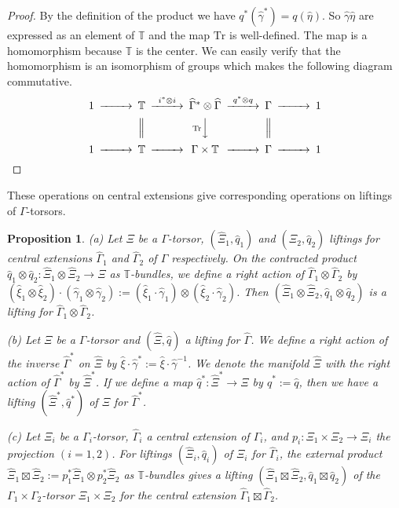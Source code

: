 \documentclass[a4paper,a4paper]{article}
\newtheorem{prop}[thm]{Proposition}
\theoremstyle{definition}
\theoremstyle{remark}
\newcommand{\T}{\mathbb{T}}
\newcommand{\Tr}{\mathrm{Tr}}
\newcommand{\hq}{\widehat{q}}
\def\h#1{ \widehat{#1} }
\begin{document}
\begin{proof}
By the definition of the product we have $q^*(\h{\gamma}^*) = q(\h{\eta})$. So $\h{\gamma} \h{\eta}$ are expressed as an element of $\T$ and the map $\Tr$ is well-defined. The map is a homomorphism because $\T$ is the center. We can easily verify that the homomorphism is an isomorphism of groups which makes the following diagram commutative. 
$$
\begin{CD}
1 @>>> \T @>i^* \otimes i>> 
\h{\Gamma}^* \otimes \h{\Gamma} @>q^* \otimes q>>  \Gamma @>>> 1 \\
@. @| @V{\Tr}VV @| @. \\
1 @>>> \T @>>> \Gamma \times \T @>>> \Gamma @>>> 1
\end{CD}
$$
\end{proof}

These operations on central extensions give corresponding operations on liftings of $\Gamma$-torsors.

\begin{prop} \label{prop_operations_liftings}
(a)
Let $\Xi$ be a $\Gamma$-torsor, $(\h{\Xi}_1, \hq_1)$ and $(\h{\Xi}_2, \hq_2)$ liftings for central extensions $\h{\Gamma}_1$ and $\h{\Gamma}_2$ of $\Gamma$ respectively. On the contracted product $\hq_1 \otimes \hq_2 : \h{\Xi}_1 \otimes \h{\Xi}_2 \to \Xi$ as $\T$-bundles, we define a right action of $\h{\Gamma}_1 \otimes \h{\Gamma}_2$ by $(\h{\xi}_1 \otimes \h{\xi}_2) \cdot (\h{\gamma}_1 \otimes \h{\gamma}_2) := (\h{\xi}_1 \cdot \h{\gamma}_1) \otimes (\h{\xi}_2 \cdot \h{\gamma}_2)$. Then $(\h{\Xi}_1 \otimes \h{\Xi}_2, \hq_1 \otimes \hq_2)$ is a lifting for $\h{\Gamma}_1 \otimes \h{\Gamma}_2$.

(b)
Let $\Xi$ be a $\Gamma$-torsor and $(\h{\Xi}, \hq)$ a lifting for $\h{\Gamma}$. We define a right action of the inverse $\h{\Gamma}^*$ on $\h{\Xi}$ by $\h{\xi} \cdot \h{\gamma}^* := \h{\xi} \cdot \h{\gamma}^{-1}$. We denote the manifold $\h{\Xi}$ with the right action of $\h{\Gamma}^*$ by $\h{\Xi}^*$. If we define a map $\hq^* : \h{\Xi}^* \to \Xi$ by $\hq^* := \hq$, then we have a lifting $(\h{\Xi}^*, \hq^*)$ of $\Xi$ for $\h{\Gamma}^*$.

(c)
Let $\Xi_i$ be a $\Gamma_i$-torsor, $\h{\Gamma}_i$ a central extension of $\Gamma_i$, and $p_i : \Xi_1 \times \Xi_2 \to \Xi_i$ the projection $(i= 1, 2)$. For liftings $(\h{\Xi}_i, \hq_i)$ of $\Xi_i$ for $\h{\Gamma}_i$, the external product $\h{\Xi}_1 \boxtimes \h{\Xi}_2 := p_1^*\h{\Xi}_1 \otimes p_2^*\h{\Xi}_2$ as $\T$-bundles gives a lifting $(\h{\Xi}_1 \boxtimes \h{\Xi}_2, \hq_1 \boxtimes \hq_2)$ of the $\Gamma_1 \times \Gamma_2$-torsor $\Xi_1 \times \Xi_2$ for the central extension $\h{\Gamma}_1 \boxtimes \h{\Gamma}_2$.
\end{prop}
\end{document}
